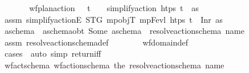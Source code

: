 \begin{isabellebody}
\ \ \ \ \ \ {\isasymlongleftrightarrow}\ {\isacharparenleft}{\kern0pt}wf{\isacharunderscore}{\kern0pt}plan{\isacharunderscore}{\kern0pt}action\ {\isasympi}\ {\isasymand}\ t\isactrlsub {\isasympi}\ {\isasymge}\ {}\ {\isasymand}\ simplify{\isacharunderscore}{\kern0pt}action\ htps\ {\isacharparenleft}{\kern0pt}t\isactrlsub {\isasympi}{\isacharcomma}{\kern0pt}{\isasympi}{\isacharparenright}{\kern0pt}\ {\isacharequal}{\kern0pt}\ as{\isacharparenright}{\kern0pt}{\isachardoublequoteclose}\isanewline
%
\isadelimproof
\ \ %
\endisadelimproof
%
\isatagproof
{}\isamarkupfalse%
\isanewline
\ \ \ \ \isamarkupfalse%
\ assm{}{\isacharcolon}{\kern0pt}\ {\isachardoublequoteopen}simplify{\isacharunderscore}{\kern0pt}actionE\ STG\ mp{\isacharunderscore}{\kern0pt}objT\ mp{\isacharunderscore}{\kern0pt}Fevl\ htps\ {\isacharparenleft}{\kern0pt}t\isactrlsub {\isasympi}{\isacharcomma}{\kern0pt}{\isasympi}{\isacharparenright}{\kern0pt}\ {\isacharequal}{\kern0pt}\ Inr\ as{\isachardoublequoteclose}\isanewline
\ \ \ \ \isamarkupfalse%
\ a\isactrlsub s\isactrlsub c\isactrlsub h\isactrlsub e\isactrlsub m\isactrlsub a\ \ a\isactrlsub s\isactrlsub c\isactrlsub h\isactrlsub e\isactrlsub m\isactrlsub a{\isacharunderscore}{\kern0pt}obt{\isacharcolon}{\kern0pt}\ {\isachardoublequoteopen}Some\ a\isactrlsub s\isactrlsub c\isactrlsub h\isactrlsub e\isactrlsub m\isactrlsub a\ {\isacharequal}{\kern0pt}\ resolve{\isacharunderscore}{\kern0pt}action{\isacharunderscore}{\kern0pt}schema\ {\isacharparenleft}{\kern0pt}name\ {\isasympi}{\isacharparenright}{\kern0pt}{\isachardoublequoteclose}\isanewline
\ \ \ \ \ \ \isamarkupfalse%
\ assm{}\ resolve{\isacharunderscore}{\kern0pt}action{\isacharunderscore}{\kern0pt}schema{\isacharunderscore}{\kern0pt}def\isanewline
\ \ \ \ \ \ \isamarkupfalse%
\ wf{\isacharunderscore}{\kern0pt}domain{\isacharunderscore}{\kern0pt}def\ \isamarkupfalse%
\ {\isacharparenleft}{\kern0pt}cases\ {\isasympi}{\isacharparenright}{\kern0pt}\ {\isacharparenleft}{\kern0pt}auto\ simp{\isacharcolon}{\kern0pt}\ return{\isacharunderscore}{\kern0pt}iff{\isacharparenright}{\kern0pt}\isanewline
\ \ \ \ \isamarkupfalse%
\ \isamarkupfalse%
\ wf{\isacharunderscore}{\kern0pt}act{\isacharunderscore}{\kern0pt}schema{\isacharunderscore}{\kern0pt}{\isasympi}{\isacharcolon}{\kern0pt}\ {\isachardoublequoteopen}wf{\isacharunderscore}{\kern0pt}action{\isacharunderscore}{\kern0pt}schema\ {\isacharparenleft}{\kern0pt}the\ {\isacharparenleft}{\kern0pt}resolve{\isacharunderscore}{\kern0pt}action{\isacharunderscore}{\kern0pt}schema\ {\isacharparenleft}{\kern0pt}name\ {\isasympi}{\isacharparenright}{\kern0pt}{\isacharparenright}{\kern0pt}{\isacharparenright}{\kern0pt}{\isachardoublequoteclose}\isanewline

\end{isabellebody}
